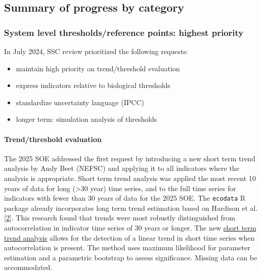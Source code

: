 \documentclass[
  10pt,
]{article}
\providecommand{\tightlist}{%
  \setlength{\itemsep}{0pt}\setlength{\parskip}{0pt}}
\begin{document}
\hypertarget{summary-of-progress-by-category}{%
\subsection{Summary of progress by
category}\label{summary-of-progress-by-category}}

\hypertarget{system-level-thresholdsreference-points-highest-priority}{%
\subsubsection{System level thresholds/reference points: highest
priority}\label{system-level-thresholdsreference-points-highest-priority}}

In July 2024, SSC review prioritized the following requests:

\begin{itemize}
\tightlist
\item
  maintain high priority on trend/threshold evaluation
\item
  express indicators relative to biological thresholds
\item
  standardize uncertainty language (IPCC)
\item
  longer term: simulation analysis of thresholds
\end{itemize}

\hypertarget{trendthreshold-evaluation}{%
\paragraph{Trend/threshold evaluation}\label{trendthreshold-evaluation}}

The 2025 SOE addressed the first request by introducing a new short term
trend analysis by Andy Beet (NEFSC) and applying it to all indicators
where the analysis is appropriate. Short term trend analysis was applied
the most recent 10 years of data for long (\textgreater30 year) time
series, and to the full time series for indicators with fewer than 30
years of data for the 2025 SOE. The \texttt{ecodata} R package already
incorporates long term trend estimation based on Hardison et al.
{[}\protect\hyperlink{ref-hardison_simulation_2019}{2}{]}. This research
found that trends were most robustly distinguished from autocorrelation
in indicator time series of 30 years or longer. The new
\href{https://noaa-edab.github.io/tech-doc/short-term-trend-analysis.html}{short
term trend analysis} allows for the detection of a linear trend in short
time series when autocorrelation is present. The method uses maximum
likelihood for parameter estimation and a parametric bootstrap to assess
significance. Missing data can be accommodated.
\end{document}
